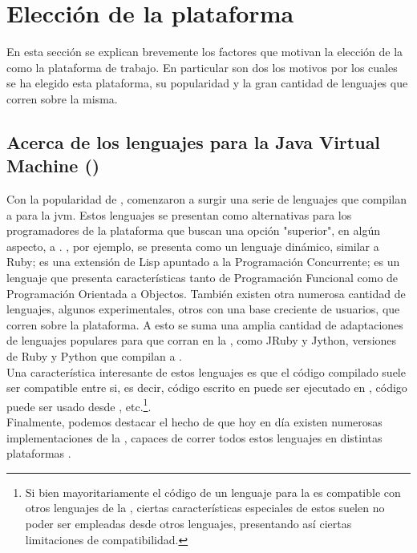 \section{Elección de la plataforma}
\label{appendix:jvm}

En esta sección se explican brevemente los factores que motivan la elección de 
la \jvm como la plataforma de trabajo. En particular son dos los motivos por 
los cuales se ha elegido esta plataforma, su popularidad y la gran cantidad de 
lenguajes que corren sobre la misma.\\

\subsection{Acerca de los lenguajes para la Java Virtual Machine (\jvm)}
\label{subsec:intro:about_jvm}

Con la popularidad de \java, comenzaron a surgir una serie de lenguajes que 
compilan a \bytecode para la \acl{jvm}. Estos lenguajes se presentan como 
alternativas para los programadores de la plataforma que buscan una opción 
"superior", en algún aspecto, a \java. \groovy, por ejemplo, se presenta como 
un lenguaje dinámico, similar a Ruby; \clojure es una extensión de Lisp 
apuntado a la Programación Concurrente; \scala es un lenguaje que presenta 
características tanto de Programación Funcional como de Programación Orientada 
a Objectos.  También existen otra numerosa cantidad de lenguajes, algunos 
experimentales, otros con una base creciente de usuarios, que corren sobre la 
plataforma. A  esto se suma una amplia cantidad de adaptaciones de lenguajes 
populares para que corran en la \jvm, como JRuby y Jython, versiones de Ruby y 
Python que compilan a \bytecode \java {}.\\
Una característica interesante de estos lenguajes es que el código compilado 
suele ser compatible entre si, es decir, código escrito en \java puede ser 
ejecutado en \scala, código \groovy puede ser usado desde \clojure, 
etc.\footnote{
	Si bien mayoritariamente el código de un lenguaje para la \jvm es 
	compatible con otros lenguajes de la \jvm, ciertas características 
	especiales de estos suelen no poder ser empleadas desde otros lenguajes, 
	presentando así ciertas limitaciones de compatibilidad.
}.\\
Finalmente, podemos destacar el hecho de que hoy en día existen numerosas 
implementaciones de la \jvm, capaces de correr todos estos lenguajes en 
distintas plataformas .\\


